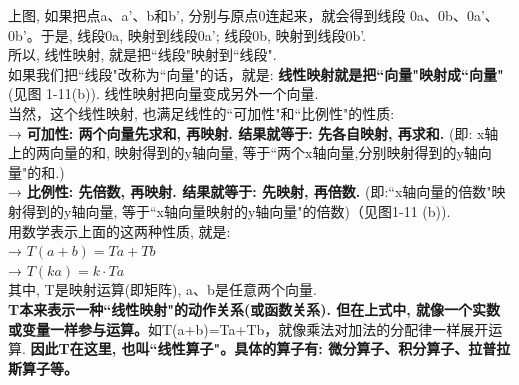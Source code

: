 \documentclass[UTF8]{ctexart}
\begin{document}
上图, 如果把点a、a'、b和b', 分别与原点0连起来，就会得到线段 0a、0b、0a'、0b'。于是, 线段0a, 映射到线段0a'; 线段0b, 映射到线段0b'.\\
所以, 线性映射, 就是把``线段"映射到``线段". \\
如果我们把``线段"改称为``向量"的话，就是: \textbf{线性映射就是把``向量"映射成``向量"}(见图 1-11(b)). 线性映射把向量变成另外一个向量.\\

当然，这个线性映射, 也满足线性的``可加性"和``比例性"的性质: \\
→ \textbf{可加性: 两个向量先求和, 再映射. 结果就等于: 先各自映射, 再求和.} (即: x轴上的两向量的和, 映射得到的y轴向量, 等于``两个x轴向量,分别映射得到的y轴向量"的和.) \\
→ \textbf{比例性:  先倍数, 再映射. 结果就等于: 先映射, 再倍数.} (即:``x轴向量的倍数"映射得到的y轴向量, 等于``x轴向量映射的y轴向量"的倍数)（见图1-11 (b)).\\

用数学表示上面的这两种性质, 就是: \\
→ $T(a+b) = Ta + Tb$ \\
→ $T(ka) = k \cdot Ta$ \\
其中, T是映射运算(即矩阵), a、b是任意两个向量. \\

\textbf{T本来表示一种``线性映射"的动作关系(或函数关系). 但在上式中, 就像一个实数或变量一样参与运算。}如T(a+b)=Ta+Tb，就像乘法对加法的分配律一样展开运算. \textbf{因此T在这里, 也叫``线性算子"。具体的算子有: 微分算子、积分算子、拉普拉斯算子等。} \\
\end{document}
